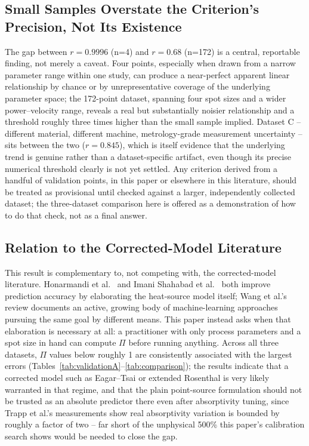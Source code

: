 \documentclass[12pt]{article}
\begin{document}
\subsection{Small Samples Overstate the Criterion's Precision, Not Its Existence}
The gap between $r=0.9996$ (n=4) and $r=0.68$ (n=172) is a central, reportable finding, not merely a caveat. Four points, especially when drawn from a narrow parameter range within one study, can produce a near-perfect apparent linear relationship by chance or by unrepresentative coverage of the underlying parameter space; the 172-point dataset, spanning four spot sizes and a wider power--velocity range, reveals a real but substantially noisier relationship and a threshold roughly three times higher than the small sample implied. Dataset C -- different material, different machine, metrology-grade measurement uncertainty -- sits between the two ($r=0.845$), which is itself evidence that the underlying trend is genuine rather than a dataset-specific artifact, even though its precise numerical threshold clearly is not yet settled. Any criterion derived from a handful of validation points, in this paper or elsewhere in this literature, should be treated as provisional until checked against a larger, independently collected dataset; the three-dataset comparison here is offered as a demonstration of how to do that check, not as a final answer.

\subsection{Relation to the Corrected-Model Literature}
This result is complementary to, not competing with, the corrected-model literature. Honarmandi et al.\ \cite{honarmandi2021} and Imani Shahabad et al.\ \cite{imanishahabad2021} both improve prediction accuracy by elaborating the heat-source model itself; Wang et al.'s \cite{wang2023} review documents an active, growing body of machine-learning approaches pursuing the same goal by different means. This paper instead asks when that elaboration is necessary at all: a practitioner with only process parameters and a spot size in hand can compute $\Pi$ before running anything. Across all three datasets, $\Pi$ values below roughly 1 are consistently associated with the largest errors (Tables~\ref{tab:validationA}--\ref{tab:comparison}); the results indicate that a corrected model such as Eagar--Tsai or extended Rosenthal is very likely warranted in that regime, and that the plain point-source formulation should not be trusted as an absolute predictor there even after absorptivity tuning, since Trapp et al.'s \cite{trapp2017} measurements show real absorptivity variation is bounded by roughly a factor of two -- far short of the unphysical 500\% this paper's calibration search shows would be needed to close the gap.
\end{document}
